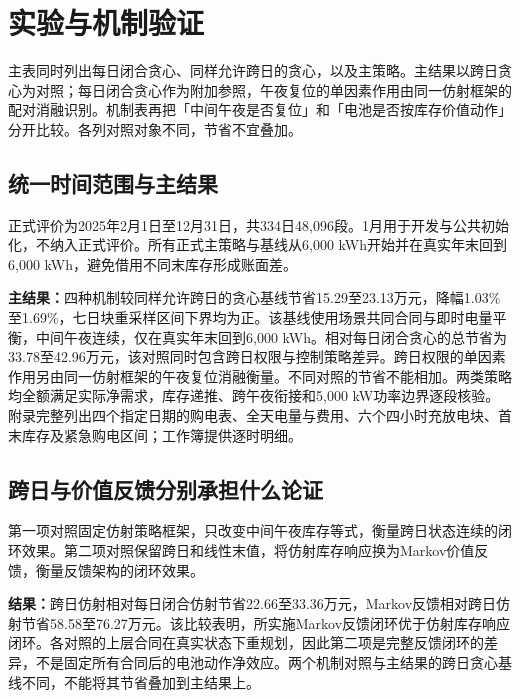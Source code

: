 \documentclass[UTF8,a4paper,zihao=-4,fontset=mac]{ctexart}
\begin{document}
\section{实验与机制验证}
主表同时列出每日闭合贪心、同样允许跨日的贪心，以及主策略。主结果以跨日贪心为对照；每日闭合贪心作为附加参照，午夜复位的单因素作用由同一仿射框架的配对消融识别。机制表再把「中间午夜是否复位」和「电池是否按库存价值动作」分开比较。各列对照对象不同，节省不宜叠加。

\subsection{统一时间范围与主结果}
正式评价为2025年2月1日至12月31日，共334日48,096段。1月用于开发与公共初始化，不纳入正式评价。所有正式主策略与基线从6,000 kWh开始并在真实年末回到6,000 kWh，避免借用不同末库存形成账面差。


\textbf{主结果：}四种机制较同样允许跨日的贪心基线节省15.29至23.13万元，降幅1.03\%至1.69\%，七日块重采样区间下界均为正。该基线使用场景共同合同与即时电量平衡，中间午夜连续，仅在真实年末回到6,000 kWh。相对每日闭合贪心的总节省为33.78至42.96万元，该对照同时包含跨日权限与控制策略差异。跨日权限的单因素作用另由同一仿射框架的午夜复位消融衡量。不同对照的节省不能相加。两类策略均全额满足实际净需求，库存递推、跨午夜衔接和5,000 kW功率边界逐段核验。附录完整列出四个指定日期的购电表、全天电量与费用、六个四小时充放电块、首末库存及紧急购电区间；工作簿提供逐时明细。

\subsection{跨日与价值反馈分别承担什么论证}
第一项对照固定仿射策略框架，只改变中间午夜库存等式，衡量跨日状态连续的闭环效果。第二项对照保留跨日和线性末值，将仿射库存响应换为Markov价值反馈，衡量反馈架构的闭环效果。

\textbf{结果：}跨日仿射相对每日闭合仿射节省22.66至33.36万元，Markov反馈相对跨日仿射节省58.58至76.27万元。该比较表明，所实施Markov反馈闭环优于仿射库存响应闭环。各对照的上层合同在真实状态下重规划，因此第二项是完整反馈闭环的差异，不是固定所有合同后的电池动作净效应。两个机制对照与主结果的跨日贪心基线不同，不能将其节省叠加到主结果上。



\end{document}

